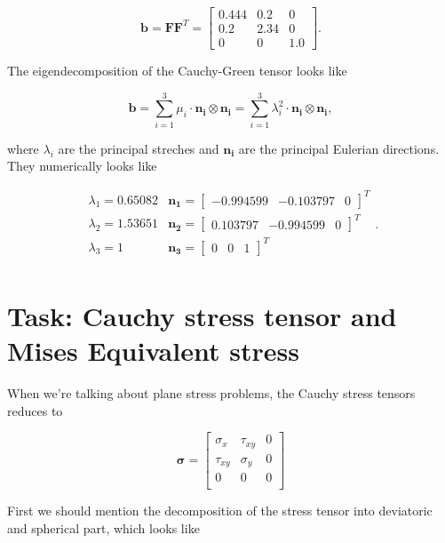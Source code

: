 \documentclass[12pt,a4paper]{article}
\begin{document}
$$
\boldsymbol{b} = \boldsymbol{F}\boldsymbol{F}^T = 
\left[\begin{matrix}0.444 & 0.2 & 0\\0.2 & 2.34 & 0\\0 & 0 & 1.0\end{matrix}\right].
$$

The eigendecomposition of the Cauchy-Green tensor looks like

$$
\boldsymbol{b} = \sum_{i=1}^3 \mu_i \cdot \boldsymbol{n_i} \otimes \boldsymbol{n_i} =  \sum_{i=1}^3 \lambda_i^2 \cdot \boldsymbol{n_i} \otimes \boldsymbol{n_i},
$$

where $\lambda_i$ are the principal streches and $\boldsymbol{n_i}$ are the principal Eulerian directions. They numerically looks like

$$
\begin{array}{ll}
    \lambda_1 = 0.65082 & \boldsymbol{n_1} = \left[\begin{matrix}-0.994599 & -0.103797 & 0\end{matrix}\right]^T \\
    \lambda_2 = 1.53651 & \boldsymbol{n_2} = \left[\begin{matrix}0.103797 & -0.994599 & 0\end{matrix}\right]^T\\
    \lambda_3 = 1 & \boldsymbol{n_3} = \left[\begin{matrix}0 & 0 & 1\end{matrix}\right]^T\\
\end{array}.
$$

\newpage

\section{Task: Cauchy stress tensor and Mises Equivalent stress}

When we're talking about plane stress problems, the Cauchy stress tensors reduces to

$$
\boldsymbol{\sigma} = 
\begin{bmatrix}
    \sigma_x & \tau_{xy} & 0\\
    \tau_{xy} & \sigma_y& 0\\
    0 & 0& 0\\
\end{bmatrix}
$$

First we should mention the decomposition of the stress tensor into deviatoric and spherical part, which looks like
\end{document}
